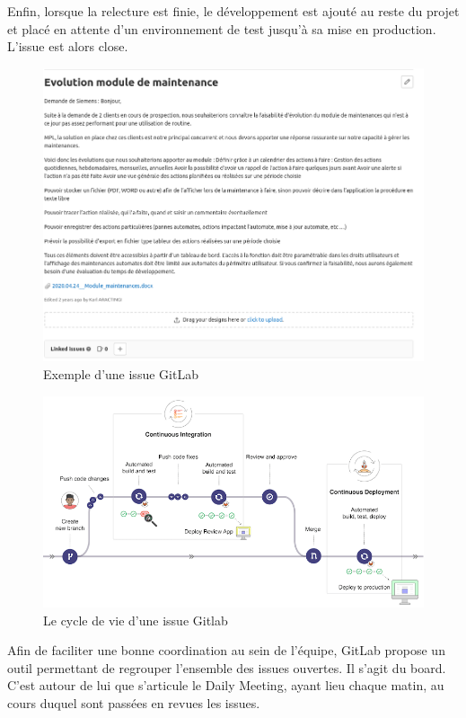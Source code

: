 Enfin, lorsque la relecture est finie, le développement est ajouté au reste du projet et placé en attente d’un environnement de test jusqu’à sa mise en production. L’issue est alors close.
\begin{figure}[hp]
    \centering
    \includegraphics{images/issue_gitlab.png}
    \caption{Exemple d'une issue GitLab}
\end{figure}
\begin{figure}[hp]
    \centering
    \includegraphics{images/cycle_gitlab.png}
    \caption{Le cycle de vie d'une issue Gitlab}
\end{figure}
\pagebreak

Afin de faciliter une bonne coordination au sein de l’équipe, GitLab propose un outil permettant de regrouper l’ensemble des issues ouvertes. Il s’agit du board.
C’est autour de lui que s’articule le Daily Meeting, ayant lieu chaque matin, au cours duquel sont passées en revues les issues.

